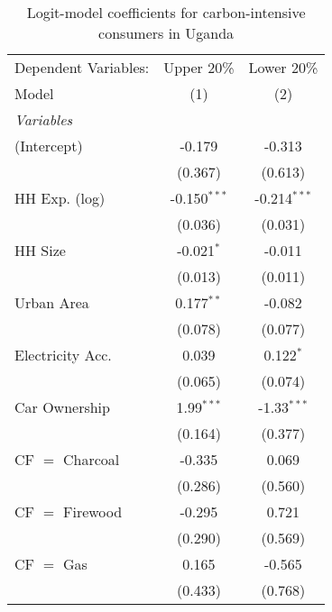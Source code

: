 
\begin{table}[htbp!]
   \centering
   \small
   \begin{adjustbox}{width = 1\textwidth, max height = 0.95\textheight, center}
      \begin{threeparttable}[b]
         \caption{\label{tab:Logit_1_UGA} Logit-model coefficients for carbon-intensive consumers in Uganda}
         \begin{tabular}{lcc}
            \tabularnewline \midrule \midrule
            Dependent Variables: & Upper 20\%     & Lower 20\%\\   
            Model                & (1)            & (2)\\  
            \midrule
            \emph{Variables}\\
            (Intercept)          & -0.179         & -0.313\\   
                                 & (0.367)        & (0.613)\\   
            HH Exp. (log)        & -0.150$^{***}$ & -0.214$^{***}$\\   
                                 & (0.036)        & (0.031)\\   
            HH Size              & -0.021$^{*}$   & -0.011\\   
                                 & (0.013)        & (0.011)\\   
            Urban Area           & 0.177$^{**}$   & -0.082\\   
                                 & (0.078)        & (0.077)\\   
            Electricity Acc.     & 0.039          & 0.122$^{*}$\\   
                                 & (0.065)        & (0.074)\\   
            Car Ownership        & 1.99$^{***}$   & -1.33$^{***}$\\   
                                 & (0.164)        & (0.377)\\   
            CF $=$ Charcoal      & -0.335         & 0.069\\   
                                 & (0.286)        & (0.560)\\   
            CF $=$ Firewood      & -0.295         & 0.721\\   
                                 & (0.290)        & (0.569)\\   
            CF $=$ Gas           & 0.165          & -0.565\\   
                                 & (0.433)        & (0.768)\\   

\end{tabular}
\end{threeparttable}
\end{adjustbox}
\end{table}
